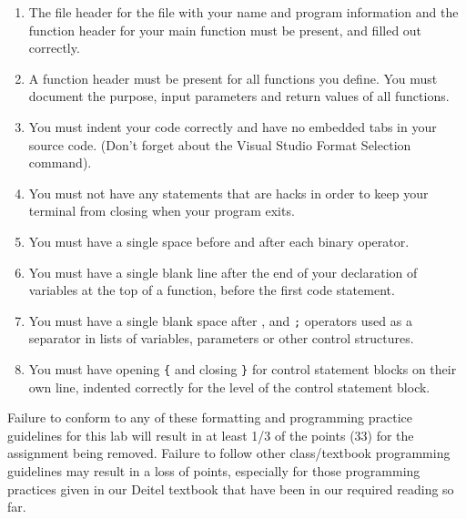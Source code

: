 \documentclass[11pt]{article}
\begin{document}
\begin{enumerate}
\item The file header for the file with your name and program information
  and the function header for your main function must be present, and
  filled out correctly.
\item A function header must be present for all functions you define.
  You must document the purpose, input parameters and return values
  of all functions.
\item You must indent your code correctly and have no embedded tabs in
  your source code. (Don't forget about the Visual Studio Format
  Selection command).
\item You must not have any statements that are hacks in order to keep
  your terminal from closing when your program exits.
\item You must have a single space before and after each binary operator.
\item You must have a single blank line after the end of your declaration
  of variables at the top of a function, before the first code
  statement.
\item You must have a single blank space after , and \verb~;~ operators used as a
  separator in lists of variables, parameters or other control
  structures.
\item You must have opening \verb~{~ and closing \verb~}~ for control statement blocks
  on their own line, indented correctly for the level of the control
  statement block.
\end{enumerate}

Failure to conform to any of these formatting and programming practice
guidelines for this lab will result in at least 1/3 of the points (33)
for the assignment being removed.  Failure to follow other
class/textbook programming guidelines may result in a loss of points,
especially for those programming practices given in our Deitel
textbook that have been in our required reading so far.
\end{document}
